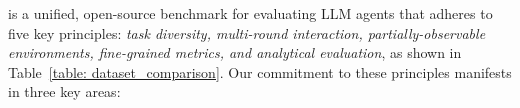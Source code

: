 
\BenchName{} is a unified, open-source benchmark for evaluating LLM agents that adheres to five key principles: \textit{task diversity, multi-round interaction, partially-observable environments, fine-grained metrics, and analytical evaluation}, as shown in Table~\ref{table: dataset_comparison}. Our commitment to these principles manifests in three key areas:
